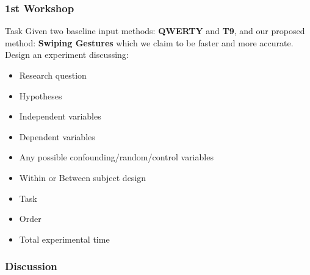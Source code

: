 \documentclass{beamer}
\begin{document}
\begin{frame}
	\frametitle{1st Workshop}
	\footnotesize
	\begin{block}{Task}	
	Given two baseline input methods: \textbf{QWERTY} and \textbf{T9}, and our proposed method: \textbf{Swiping Gestures} which we claim to be faster and more accurate.   Design an experiment discussing:
	\begin{itemize}
	\item Research question
	\item Hypotheses
	\item Independent variables
	\item Dependent variables
	\item Any possible confounding/random/control variables
	\item Within or Between subject design
	\item Task
	\item Order
	\item Total experimental time
	\end{itemize}
	\end{block}
\end{frame}

\begin{frame}
	\frametitle{Discussion}
\end{frame}
\end{document}
